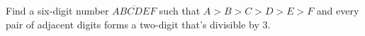 Find a six-digit number $\overline{ABCDEF}$ such that $A>B>C>D>E>F$ and every pair of adjacent digits forms a two-digit that's divisible by $3$.
